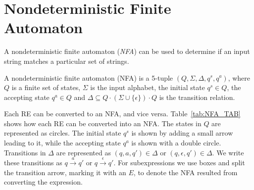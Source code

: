 \section{Nondeterministic Finite Automaton}\label{RA_TO_NFA}
A nondeterministic finite automaton (\emph{NFA}) can be used to determine if an input string matches a particular set of strings.
\begin{mydef}
A nondeterministic finite automaton (NFA) is a 5-tuple $(Q,\Sigma,\Delta,q^s ,q^a)$, where $Q$ is a finite set of states, $\Sigma$ is the input alphabet, the initial state $q^s \in Q$,  the accepting state $q^a \in Q$ and $\Delta \subseteq Q \cdot (\Sigma \cup \{\epsilon\}) \cdot Q$ is the transition relation.
\end{mydef}
\noindent Each RE can be converted to an NFA, and vice versa. Table~\ref{tab:NFA_TAB} shows how each RE can be converted into an NFA. The states in $Q$ are represented as circles. The initial state $q^s$ is shown by adding a small arrow leading to it, while the accepting state $q^a$ is shown with a double circle. Transitions in $\Delta$ are represented as  $(q,a,q')\in \Delta$ or $(q,\epsilon ,q')\in\Delta$. We write these transitions as $q \xrightarrow{a} q'$ or $q \xrightarrow{\epsilon} q'$. For subexpressions we use boxes and split the transition arrow, marking it with an $E$, to denote the NFA resulted from converting the expression. 


